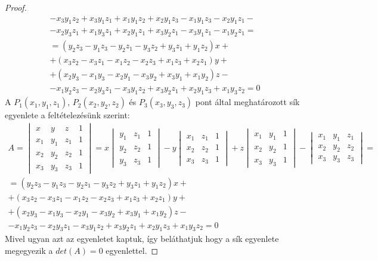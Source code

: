 \begin{proof}
\[\begin{array}{c}
	- x_3 y_1 z_2 + x_3 y_1 z_1 + x_1 y_1 z_2 + x_2 y_1 z_3 - x_1 y_1 z_3 - x_2 y_1 z_1 -\\
	- x_2 y_3 z_1 + x_1 y_3 z_1 + x_2 y_1 z_1 + x_3 y_2 z_1 - x_3 y_1 z_1 - x_1 y_2 z_1 =\\
	=(y_2 z_3 - y_1 z_3 - y_2 z_1 - y_3 z_2 + y_3 z_1 + y_1 z_2)x+\\
	+(x_3 z_2 - x_3 z_1 - x_1 z_2 - x_2 z_3 + x_1 z_3 + x_2 z_1)y+\\
	+(x_2 y_3 - x_1 y_3 - x_2 y_1 - x_3 y_2 + x_3 y_1 + x_1 y_2)z-\\
	- x_1 y_2 z_3 - x_2 y_3 z_1 - x_3 y_1 z_2 + x_3 y_2 z_1 + x_2 y_1 z_3  + x_1 y_3 z_2 = 0
\end{array}
\]
A $P_1(x_1, y_1, z_1)$, $P_2(x_2, y_2, z_2)$ és $P_3(x_3, y_3, z_3)$ pont által meghatározott sík egyenlete a feltételezésünk szerint:
\[
\begin{array}{c}
	A =
	\begin{vmatrix}
		x & y & z & 1 \\
		x_1 & y_1 & z_1 & 1 \\
		x_2 & y_2 & z_2 & 1 \\
		x_3 & y_3 & z_3 & 1
	\end{vmatrix}
	 = x
	\begin{vmatrix}
	 	y_1 & z_1 & 1 \\
	 	y_2 & z_2 & 1 \\
	 	y_3 & z_3 & 1
	\end{vmatrix}
	- y
	\begin{vmatrix}
		x_1 & z_1 & 1 \\
		x_2 & z_2 & 1 \\
		x_3 & z_3 & 1
	\end{vmatrix}
	+ z
	\begin{vmatrix}
		x_1 & y_1 & 1 \\
		x_2 & y_2 & 1 \\
		x_3 & y_3 & 1
	\end{vmatrix}
	-
	\begin{vmatrix}
		x_1 & y_1 & z_1 \\
		x_2 & y_2 & z_2 \\
		x_3 & y_3 & z_3
	\end{vmatrix}
	=\\
	=(y_2 z_3 - y_1 z_3 - y_2 z_1 - y_3 z_2 + y_3 z_1 + y_1 z_2)x+\\
	+(x_3 z_2 - x_3 z_1 - x_1 z_2 - x_2 z_3 + x_1 z_3 + x_2 z_1)y+\\
	+(x_2 y_3 - x_1 y_3 - x_2 y_1 - x_3 y_2 + x_3 y_1 + x_1 y_2)z-\\
	- x_1 y_2 z_3 - x_2 y_3 z_1 - x_3 y_1 z_2 + x_3 y_2 z_1 + x_2 y_1 z_3  + x_1 y_3 z_2 = 0
\end{array}
\]
Mivel ugyan azt az egyenletet kaptuk, így beláthatjuk hogy a sík egyenlete megegyezik a $det(A)=0$ egyenlettel.
\end{proof}

